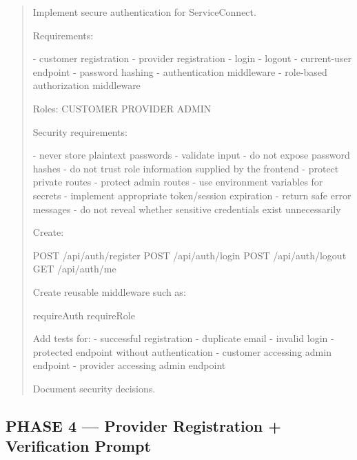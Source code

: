 \begin{quote}
Implement secure authentication for ServiceConnect.

Requirements:

- customer registration
- provider registration
- login
- logout
- current-user endpoint
- password hashing
- authentication middleware
- role-based authorization middleware

Roles:
CUSTOMER
PROVIDER
ADMIN

Security requirements:

- never store plaintext passwords
- validate input
- do not expose password hashes
- do not trust role information supplied by the frontend
- protect private routes
- protect admin routes
- use environment variables for secrets
- implement appropriate token/session expiration
- return safe error messages
- do not reveal whether sensitive credentials exist unnecessarily

Create:

POST /api/auth/register
POST /api/auth/login
POST /api/auth/logout
GET /api/auth/me

Create reusable middleware such as:

requireAuth
requireRole

Add tests for:
- successful registration
- duplicate email
- invalid login
- protected endpoint without authentication
- customer accessing admin endpoint
- provider accessing admin endpoint

Document security decisions.
\end{quote}

\subsection*{PHASE 4 --- Provider Registration + Verification Prompt}

